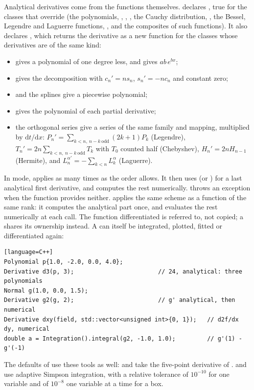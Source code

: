 Analytical derivatives come from the functions themselves.  declares ,
true for the classes that override  (the polynomials, , ,
, the Cauchy distribution, , the Bessel, Legendre and Laguerre functions,
, and the composites of such functions). It also declares ,
which returns the derivative as a new function for the classes whose derivatives are of the same kind:
\begin{itemize}
\item {} gives a polynomial of one degree less, and  gives $ab\,e^{bx}$;
\item {} gives the decomposition with $c_n' = n s_n$, $s_n' = -n c_n$ and constant zero;
\item {} and the splines give a piecewise polynomial;
\item {} gives the polynomial of each partial derivative;
\item the orthogonal series give a series of the same family and mapping, multiplied by $\mathrm{d}t/\mathrm{d}x$:
$P_n' = \sum_{k<n,\ n-k\ \mathrm{odd}}(2k+1)P_k$ (Legendre), $T_n' = 2n\sum_{k<n,\ n-k\ \mathrm{odd}}T_k$ with $T_0$
counted half (Chebyshev), $H_n' = 2nH_{n-1}$ (Hermite), and $L_n^{\alpha\prime} = -\sum_{k<n}L_k^\alpha$ (Laguerre).
\end{itemize}

In  mode,  applies  as many times as the order allows.
It then uses  (or ) for a last analytical first derivative, and computes
the rest numerically.  throws an exception when the function provides neither. 
applies the same scheme as a function of the same rank: it computes the analytical part once, and evaluates the rest
numerically at each call. The function differentiated is referred to, not copied; a  shares
its ownership instead. A  can itself be integrated, plotted, fitted or differentiated again:
\begin{widetext}
\begin{verbatim}[language=C++]
Polynomial p{1.0, -2.0, 0.0, 4.0};
Derivative d3(p, 3);                        // 24, analytical: three polynomials
Normal g(1.0, 0.0, 1.5);
Derivative g2(g, 2);                        // g' analytical, then numerical
Derivative dxy(field, std::vector<unsigned int>{0, 1});   // d2f/dx dy, numerical
double a = Integration().integral(g2, -1.0, 1.0);         // g'(1) - g'(-1)
\end{verbatim}
\end{widetext}
The defaults of  use these tools as well:  and  take the
five-point derivative of .  and  use adaptive
Simpson integration, with a relative tolerance of $10^{-10}$ for one variable and of $10^{-8}$ one variable at a time
for a box.

